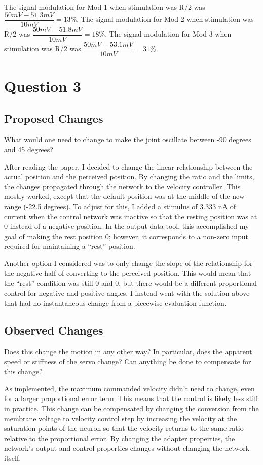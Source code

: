 The signal modulation for Mod 1 when stimulation was R/2 was $\dfrac{50 mV - 51.3 mV}{10 mV} = 13\%$.
The signal modulation for Mod 2 when stimulation was R/2 was $\dfrac{50 mV - 51.8 mV}{10 mV} = 18\%$.
The signal modulation for Mod 3 when stimulation was R/2 was $\dfrac{50 mV - 53.1 mV}{10 mV} = 31\%$.

\section{Question 3}

\subsection{Proposed Changes}

What would one need to change to make the joint oscillate between -90 degrees and 45
degrees?

After reading the paper, I decided to change the linear relationship between the actual position and the perceived position. By changing the ratio and the limits, the changes propagated through the network to the velocity controller. This mostly worked, except that the default position was at the middle of the new range (-22.5 degrees). To adjust for this, I added a stimulus of 3.333 nA of current when the control network was inactive so that the resting position was at 0 instead of a negative position. In the output data tool, this accomplished my goal of making the rest position 0; however, it corresponds to a non-zero input required for maintaining a ``rest'' position.

Another option I considered was to only change the slope of the relationship for the negative half of converting to the perceived position. This would mean that the ``rest'' condition was still 0 and 0, but there would be a different proportional control for negative and positive angles. I instead went with the solution above that had no instantaneous change from a piecewise evaluation function.

\subsection{Observed Changes}

Does this change the motion in any other way? In particular, does the apparent speed or stiffness of
the servo change? Can anything be done to compensate for this change?

As implemented, the maximum commanded velocity didn't need to change, even for a larger proportional error term. This means that the control is likely less stiff in practice. This change can be compensated by changing the conversion from the membrane voltage to velocity control step by increasing the velocity at the saturation points of the neuron so that the velocity returns to the same ratio relative to the proportional error. By changing the adapter properties, the network's output and control properties changes without changing the network itself.

